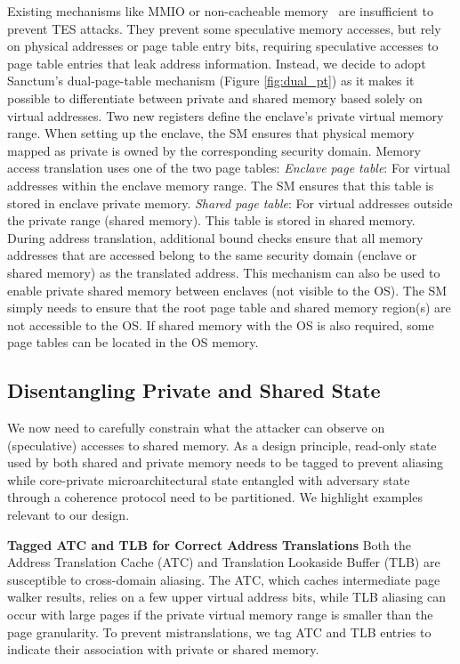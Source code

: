 Existing mechanisms like MMIO or non-cacheable memory~\cite{schwarz2020context, costan2016intel} are insufficient to prevent TES attacks.
They prevent some speculative memory accesses, but rely on physical addresses or page table entry bits, requiring speculative accesses to page table entries that leak address information.
Instead, we decide to adopt Sanctum's dual-page-table mechanism (Figure \ref{fig:dual_pt}) as it makes it possible to differentiate between private and shared memory based solely on virtual addresses.
Two new registers define the enclave's private virtual memory range.
When setting up the enclave, the SM ensures that physical memory mapped as private is owned by the corresponding security domain.
Memory access translation uses one of the two page tables:
\emph{Enclave page table}: For virtual addresses within the enclave memory range. The SM ensures that this table is stored in enclave private memory.
\emph{Shared page table}: For virtual addresses outside the private range (shared memory). This table is stored in shared memory.
\noindent During address translation, additional bound checks ensure that all memory addresses that are accessed belong to the same security domain (enclave or shared memory) as the translated address.
This mechanism can also be used to enable private shared memory between enclaves (not visible to the OS).
The SM simply needs to ensure that the root page table and shared memory region(s) are not accessible to the OS.
If shared memory with the OS is also required, some page tables can be located in the OS memory.

\subsection{Disentangling Private and Shared State}
\label{sec:disentangle}
We now need to carefully constrain what the attacker can observe on (speculative) accesses to shared memory.
As a design principle, read-only state used by both shared and private memory needs to be tagged to prevent aliasing while
core-private microarchitectural state entangled with adversary state through a coherence protocol need to be partitioned.
We highlight examples relevant to our design.

\noindent\textbf{Tagged ATC and TLB for Correct Address Translations} 
Both the Address Translation Cache (ATC) and Translation Lookaside Buffer (TLB) are susceptible to cross-domain aliasing.
The ATC, which caches intermediate page walker results, relies on a few upper virtual address bits, while TLB aliasing can occur with large pages if the private virtual memory range is smaller than the page granularity.
To prevent mistranslations, we tag ATC and TLB entries to indicate their association with private or shared memory.

